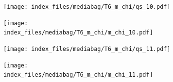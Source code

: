 \documentclass[
  11pt,
  letterpaper,
]{scrreprt}
\begin{document}
\begin{figure}

\begin{minipage}{0.50\linewidth}

\begin{figure}[H]

{\centering \texttt{[image: index\_files/mediabag/T6\_m\_chi/qs\_10.pdf]}

}


\end{figure}%

\end{minipage}%
%
\begin{minipage}{0.50\linewidth}

\begin{figure}[H]

{\centering \texttt{[image: index\_files/mediabag/T6\_m\_chi/m\_chi\_10.pdf]}

}


\end{figure}%

\end{minipage}%

\end{figure}%

\begin{figure}

\begin{minipage}{0.50\linewidth}

\begin{figure}[H]

{\centering \texttt{[image: index\_files/mediabag/T6\_m\_chi/qs\_11.pdf]}

}


\end{figure}%

\end{minipage}%
%
\begin{minipage}{0.50\linewidth}

\begin{figure}[H]

{\centering \texttt{[image: index\_files/mediabag/T6\_m\_chi/m\_chi\_11.pdf]}

}


\end{figure}%

\end{minipage}%

\end{figure}%
\end{document}
